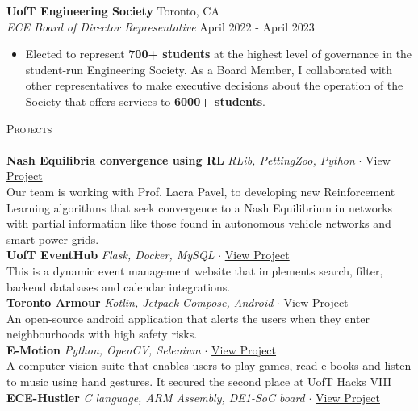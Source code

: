 \documentclass[a4paper]{article}
\newcommand{\lineunder} {
    \vspace*{-8pt} \\
    \hspace*{-18pt} \hrulefill \\
}
\newcommand{\header} [1] {
    {\hspace*{-18pt}\vspace*{6pt} \textsc{#1}}
    \vspace*{-6pt} \lineunder
}
\begin{document}
\textbf{UofT Engineering Society} \hfill Toronto, CA\\
\textit{ECE Board of Director Representative} \hfill April 2022 - April 2023\\
\vspace{-3pt}
\begin{itemize}
	\item Elected to represent \textbf{700+ students} at the highest level of governance in the student-run Engineering Society. As a Board Member, I collaborated with other representatives to make executive decisions about the operation of the Society that offers services to \textbf{6000+ students}.
\end{itemize}

\header{Projects}
{\textbf{Nash Equilibria convergence using RL}} {\sl RLib, PettingZoo, Python} $\cdot$ \href{https://github.com/BoundlessDevelopment/Capstone-Project}{View Project}\\
Our team is working with Prof. Lacra Pavel, to developing new Reinforcement Learning algorithms that seek convergence to a Nash Equilibrium in networks
 with partial information like those found in autonomous vehicle networks and smart power grids.\\
\vspace*{2mm}
{\textbf{UofT EventHub}} {\sl Flask, Docker, MySQL} $\cdot$ \href{https://netninjahub.onrender.com/}{View Project}\\
This is a dynamic event management website that implements search, filter, backend databases and calendar integrations. \\
\vspace*{2mm}
{\textbf{Toronto Armour}} {\sl Kotlin, Jetpack Compose, Android} $\cdot$ \href{https://github.com/pandyah5/TorontoArmour}{View Project} \\
An open-source android application that alerts the users when they enter neighbourhoods with high safety risks.\\
\vspace*{2mm}
{\textbf{E-Motion}} {\sl Python, OpenCV, Selenium} $\cdot$ \href{https://devpost.com/software/e-motion-otbl2i}{View Project} \\
A computer vision suite that enables users to play games, read e-books and listen to music using hand gestures. It secured the second place at UofT Hacks VIII\\
\vspace*{2mm}
{\textbf{ECE-Hustler}} {\sl C language, ARM Assembly, DE1-SoC board} $\cdot$ \href{https://github.com/pandyah5/ECE-Hustler}{View Project} \\
\end{document}
